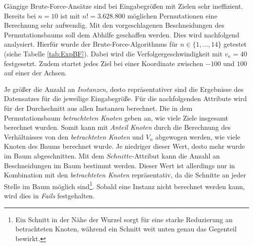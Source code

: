 \documentclass[german,version-2019-11]{uzl-thesis}
\begin{document}
Gängige Brute-Force-Ansätze sind bei Eingabegrößen mit Zielen sehr ineffizient. Bereits bei $n=10$ ist mit $n!=3.628.800$ möglichen Permutationen eine Berechnung sehr aufwendig. Mit den vorgeschlagenen Beschneidungen des Permutationsbaums soll dem Abhilfe geschaffen werden. Dies wird nachfolgend analysiert. Hierfür wurde der Brute-Force-Algorithmus für $n\in\{1,\dots,14\}$ getestet (siehe Tabelle \ref{tab:ExpBF}). Dabei wird die Verfolgergeschwindigkeit mit $v_{\kappa}=40$ festgesetzt. Zudem startet jedes Ziel bei einer Koordinate zwischen $-100$ und $100$ auf einer der Achsen. 

Je größer die Anzahl an \emph{Instanzen}, desto repräsentativer sind die Ergebnisse des Datensatzes für die jeweilige Eingabegröße. Für die nachfolgenden Attribute wird für der Durchschnitt aus allen Instanzen berechnet. Die in dem Permutationsbaum \emph{betrachteten Knoten} geben an, wie viele Ziele insgesamt berechnet wurden. Somit kann mit \emph{Anteil Knoten} durch die Berechnung des Verhältnisses von den \emph{betrachteten Knoten} und $V_n$ abgewogen werden, wie viele Knoten des Baums berechnet wurde. Je niedriger dieser Wert, desto mehr wurde im Baum abgeschnitten. Mit dem $Schnitte$-Attribut kann die Anzahl an Beschneidungen im Baum bestimmt werden. Dieser Wert ist allerdings nur in Kombination mit den \emph{betrachteten Knoten} repräsentativ, da die Schnitte an jeder Stelle im Baum möglich sind\footnote{Ein Schnitt in der Nähe der Wurzel sorgt für eine starke Reduzierung an betrachteten Knoten, während ein Schnitt weit unten genau das Gegenteil bewirkt.}. Sobald eine Instanz nicht berechnet werden kann, wird dies in \emph{Fails} festgehalten.
\end{document}
